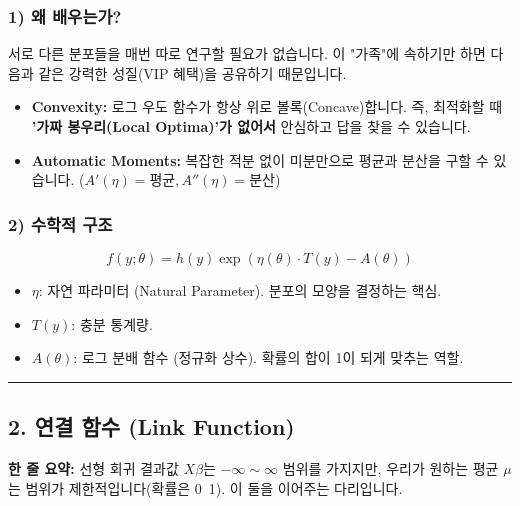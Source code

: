\documentclass[11pt,a4paper]{book}
\theoremstyle{definition}
\begin{document}
\subsubsection*{1) 왜 배우는가?}
서로 다른 분포들을 매번 따로 연구할 필요가 없습니다. 이 "가족"에 속하기만 하면 다음과 같은 강력한 성질(VIP 혜택)을 공유하기 때문입니다.
\begin{itemize}
    \item \textbf{Convexity:} 로그 우도 함수가 항상 위로 볼록(Concave)합니다. 즉, 최적화할 때 \textbf{'가짜 봉우리(Local Optima)'가 없어서} 안심하고 답을 찾을 수 있습니다.
    \item \textbf{Automatic Moments:} 복잡한 적분 없이 미분만으로 평균과 분산을 구할 수 있습니다. ($A'(\eta) = \text{평균}, A''(\eta) = \text{분산}$)
\end{itemize}

\subsubsection*{2) 수학적 구조}
$$ f(y; \theta) = h(y) \exp\left( \eta(\theta) \cdot T(y) - A(\theta) \right) $$
\begin{itemize}
    \item $\eta$: 자연 파라미터 (Natural Parameter). 분포의 모양을 결정하는 핵심.
    \item $T(y)$: 충분 통계량.
    \item $A(\theta)$: 로그 분배 함수 (정규화 상수). 확률의 합이 1이 되게 맞추는 역할.
\end{itemize}

\vspace{0.5cm}\hrule\vspace{0.5cm}

\subsection{2. 연결 함수 (Link Function)}


\begin{conceptbox}[title={개념 2: 무한의 세계와 유한의 세계를 잇다}]
\textbf{한 줄 요약:} 선형 회귀 결과값 $X\beta$는 $-\infty \sim \infty$ 범위를 가지지만, 우리가 원하는 평균 $\mu$는 범위가 제한적입니다(확률은 0~1). 이 둘을 이어주는 다리입니다.
\end{conceptbox}
\end{document}

